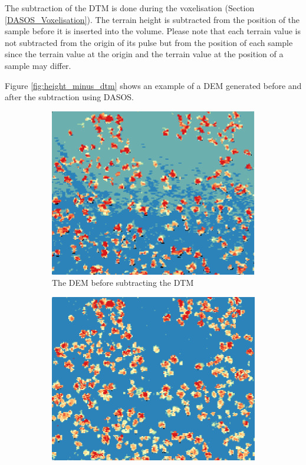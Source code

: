 \documentclass{subfiles}
\begin{document}
\par The subtraction of the DTM is done during the voxelisation (Section \ref{DASOS_Voxelisation}). The terrain height is subtracted from the position of the sample before it is inserted into the volume. Please note that each terrain value is not subtracted from the origin of its pulse but from the position of each sample since the terrain value at the origin and the terrain value at the position of a sample may differ. 
\par Figure \ref{fig:height_minus_dtm} shows an example of a DEM generated before and after the subtraction using DASOS. 


\begin{figure} [h!]			
	\begin{subfigure}[t]{.49\textwidth}
		
		\centering
		\includegraphics[width=\textwidth]{img/dead/height}
		\caption{The DEM before subtracting the DTM}
		\label{fig:height}
	\end{subfigure} \hfill
	\begin{subfigure}[t]{.49\textwidth}
		\centering
		\includegraphics[width=\textwidth]{img/dead/height_dtm}

\end{subfigure}
\end{figure}
\end{document}
